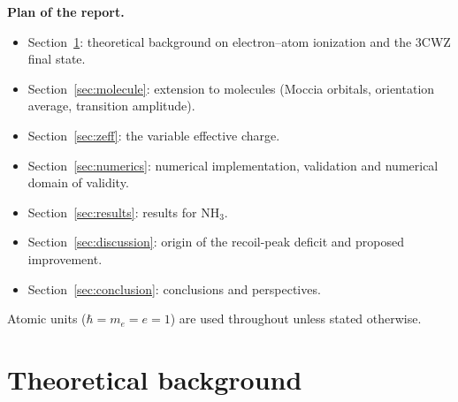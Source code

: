 \documentclass[11pt,a4paper]{article}
\newcommand{\NH}{NH$_3$}
\begin{document}
\textbf{Plan of the report.}
\begin{itemize}
\item Section~\ref{sec:background}: theoretical background on electron--atom ionization and the
  3CWZ final state.
\item Section~\ref{sec:molecule}: extension to molecules (Moccia orbitals, orientation average,
  transition amplitude).
\item Section~\ref{sec:zeff}: the variable effective charge.
\item Section~\ref{sec:numerics}: numerical implementation, validation and numerical domain of
  validity.
\item Section~\ref{sec:results}: results for \NH.
\item Section~\ref{sec:discussion}: origin of the recoil-peak deficit and proposed improvement.
\item Section~\ref{sec:conclusion}: conclusions and perspectives.
\end{itemize}
Atomic units ($\hbar=m_e=e=1$) are used throughout unless stated otherwise.

\section{Theoretical background}\label{sec:background}
\end{document}
